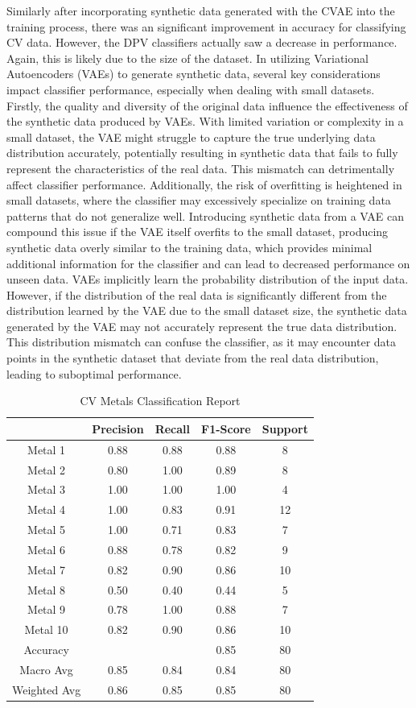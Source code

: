 Similarly after incorporating synthetic data generated with the CVAE into the training process, there was an significant improvement in accuracy for classifying CV data. However, the DPV classifiers actually saw a decrease in performance. Again, this is likely due to the size of the dataset. In utilizing Variational Autoencoders (VAEs) to generate synthetic data, several key considerations impact classifier performance, especially when dealing with small datasets. Firstly, the quality and diversity of the original data influence the effectiveness of the synthetic data produced by VAEs. With limited variation or complexity in a small dataset, the VAE might struggle to capture the true underlying data distribution accurately, potentially resulting in synthetic data that fails to fully represent the characteristics of the real data. This mismatch can detrimentally affect classifier performance. Additionally, the risk of overfitting is heightened in small datasets, where the classifier may excessively specialize on training data patterns that do not generalize well. Introducing synthetic data from a VAE can compound this issue if the VAE itself overfits to the small dataset, producing synthetic data overly similar to the training data, which provides minimal additional information for the classifier and can lead to decreased performance on unseen data. VAEs implicitly learn the probability distribution of the input data. However, if the distribution of the real data is significantly different from the distribution learned by the VAE due to the small dataset size, the synthetic data generated by the VAE may not accurately represent the true data distribution. This distribution mismatch can confuse the classifier, as it may encounter data points in the synthetic dataset that deviate from the real data distribution, leading to suboptimal performance.
\begin{table}[!h]
\begin{center}
\begin{tabular}{c|c|c|c|c}
 & Precision & Recall & F1-Score & Support\\
\hline
Metal 1 & 0.88 & 0.88 & 0.88 & 8\\
Metal 2 & 0.80 & 1.00 & 0.89 & 8\\
Metal 3 & 1.00 & 1.00 & 1.00 & 4\\
Metal 4 & 1.00 & 0.83 & 0.91 & 12\\
Metal 5 & 1.00 & 0.71 & 0.83 & 7\\
Metal 6 & 0.88 & 0.78 & 0.82 & 9\\
Metal 7 & 0.82 & 0.90 & 0.86 & 10\\
Metal 8 & 0.50 & 0.40 & 0.44 & 5\\
Metal 9 & 0.78 & 1.00 & 0.88 & 7\\
Metal 10 & 0.82 & 0.90 & 0.86 & 10\\
\hline
Accuracy & & & 0.85 & 80\\
Macro Avg & 0.85 & 0.84 & 0.84 & 80\\
Weighted Avg & 0.86 & 0.85 & 0.85 & 80
\end{tabular}
\caption{CV Metals Classification Report}
\label{cv_metal_report}
\end{center}
\end{table}

